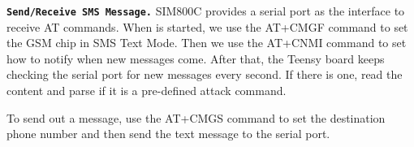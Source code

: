 \textbf{\texttt{Send/Receive SMS Message.}} SIM800C provides a serial port as the interface to receive AT commands. When \name is started, we use the AT+CMGF command to set the GSM chip in SMS Text Mode. Then we use the AT+CNMI command to set how to notify when new messages come. After that, the Teensy board keeps checking the serial port for new messages every second. If there is one, read the content and parse if it is a pre-defined attack command.

To send out a message, use the AT+CMGS command to set the destination phone number and then send the text message to the serial port. 
